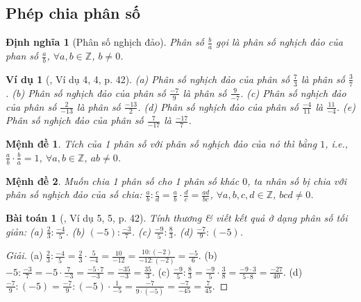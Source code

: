\documentclass{article}
\newtheorem{baitoan}{Bài toán}
\newtheorem{dinhnghia}{Định nghĩa}
\newtheorem{menhde}{Mệnh đề}
\newtheorem{vidu}{Ví dụ}
\begin{document}
\subsection{Phép chia phân số}

\begin{dinhnghia}[Phân số nghịch đảo]
	Phân số $\frac{b}{a}$ gọi là \emph{phân số nghịch đảo} của phan số $\frac{a}{b}$, $\forall a,b\in\mathbb{Z}$, $b\ne0$.
\end{dinhnghia}

\begin{vidu}[\cite{SGK_Toan_6_Canh_Dieu_tap_2}, Ví dụ 4, 4, p. 42]
	(a) Phân số nghịch đảo của phân số $\frac{7}{3}$ là phân số $\frac{3}{7}$. (b) Phân số nghịch đảo của phân số $\frac{-7}{9}$ là phân số $\frac{9}{-7}$. (c) Phân số nghịch đảo của phân số $\frac{2}{-13}$ là phân số $\frac{-13}{2}$. (d) Phân số nghịch đảo của phân số $\frac{-4}{11}$ là $\frac{11}{-4}$. (e) Phân số nghịch đảo của phân số $\frac{7}{-17}$ là $\frac{-17}{7}$.
\end{vidu}

\begin{menhde}
	Tích của 1 phân số với phân số nghịch đảo của nó thì bằng $1$, i.e., $\frac{a}{b}\cdot\frac{b}{a} = 1$, $\forall a,b\in\mathbb{Z}$, $ab\ne0$.
\end{menhde}

\begin{menhde}
	Muốn chia 1 phân số cho 1 phân số khác $0$, ta nhân số bị chia với phân số nghịch đảo của số chia: $\frac{a}{b}:\frac{c}{d} = \frac{a}{b}\cdot\frac{d}{c} = \frac{ad}{bc}$, $\forall a,b,c,d\in\mathbb{Z}$, $bcd\ne0$.
\end{menhde}

\begin{baitoan}[\cite{SGK_Toan_6_Canh_Dieu_tap_2}, Ví dụ 5, 5, p. 42]
	Tính thương \& viết kết quả ở dạng phân số tối giản: (a) $\frac{2}{3}:\frac{-4}{5}$. (b) $(-5):\frac{-3}{7}$. (c) $\frac{-9}{5}:\frac{8}{3}$. (d) $\frac{-7}{9}:(-5)$.
\end{baitoan}

\begin{proof}[Giải]
	(a) $\frac{2}{3}:\frac{-4}{5} = \frac{2}{3}\cdot\frac{5}{-4} = \frac{10}{-12} = \frac{10:(-2)}{-12:(-2)} = \frac{-5}{6}$. (b) $-5:\frac{-3}{7} =  -5\cdot\frac{7}{-3} = \frac{-5\cdot7}{-3} = \frac{-35}{-3} = \frac{35}{3}$. (c) $\frac{-9}{5}:\frac{8}{3} = \frac{-9}{5}\cdot\frac{3}{8} = \frac{-9\cdot3}{5\cdot8} = \frac{-27}{40}$. (d) $\frac{-7}{9}:(-5) = \frac{-7}{9}:(-5)\cdot\frac{1}{-5} = \frac{-7}{9\cdot(-5)} = \frac{-7}{-45} = \frac{7}{45}$.
\end{proof}
\end{document}
